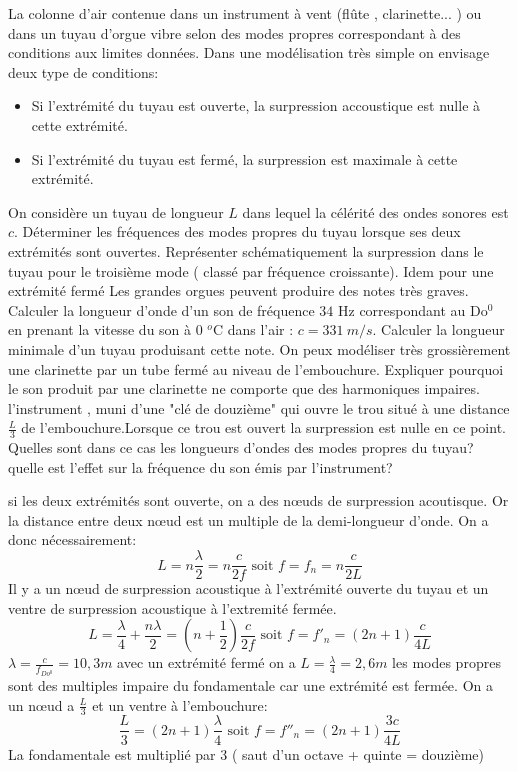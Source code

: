 \begin{Exercise}[title=Fréquence propre d'un tuyau]
	La colonne d'air contenue dans un instrument à vent (flûte , clarinette... ) ou dans un tuyau d'orgue vibre selon des modes propres correspondant à des conditions aux limites données. Dans une modélisation très simple on envisage deux type de  conditions:
	\begin{itemize}
		\item Si l'extrémité du tuyau est ouverte, la surpression accoustique est nulle à cette extrémité.
		\item Si l'extrémité du tuyau est fermé, la surpression est maximale à cette extrémité.
	\end{itemize}
	\Question On considère un tuyau de longueur $L$ dans lequel la  célérité des ondes sonores est $c$.
	\subQuestion Déterminer les fréquences des modes propres du tuyau lorsque ses deux extrémités sont ouvertes. Représenter schématiquement la surpression dans le tuyau pour le troisième mode ( classé par fréquence croissante).
	\subQuestion Idem pour une extrémité fermé
	\Question Les grandes orgues peuvent produire des notes très graves.
    Calculer la longueur d'onde d'un son de fréquence $34$ Hz correspondant au
    Do$^0$ en prenant la vitesse du son à 0 $^o$C dans l'air : $c=331~m/s$. Calculer la longueur minimale d'un tuyau produisant cette note.
	\Question On peux modéliser très grossièrement une clarinette par un tube fermé au niveau de l'embouchure.
	\subQuestion Expliquer pourquoi le son produit par une clarinette ne comporte que des harmoniques impaires.
	\subQuestion l'instrument , muni d'une "clé de douzième" qui ouvre le trou situé à une distance $\frac{L}{3}$ de l'embouchure.Lorsque ce trou est ouvert la surpression est nulle en ce point. Quelles sont dans ce cas les longueurs d'ondes des modes propres du tuyau? quelle est l'effet sur la fréquence du son émis par l'instrument?
\end{Exercise}
\begin{Answer}
	\Question
	\subQuestion si les deux extrémités sont ouverte, on a des nœuds de surpression acoutisque. Or la distance entre deux nœud est un multiple de la demi-longueur d'onde. On a donc nécessairement:
	\[L= n \frac{\lambda}{2} = n\frac{c}{2f} \text{ soit } f=f_n=n\frac{c}{2L}\]
	\subQuestion Il y a un nœud de surpression acoustique à l'extrémité ouverte du tuyau et un ventre de surpression acoustique à l'extremité fermée.
	\[L=\frac{\lambda}{4}+\frac{n\lambda}{2}=\left(n+\frac{1}{2}\right)\frac{c}{2f} \text{ soit }f=f'_n=(2n+1)\frac{c}{4L}\]
	\Question $\lambda=\frac{c}{f_{Do^0}}=10,3 m$ avec un extrémité fermé on a $L=\frac{\lambda}{4}=2,6m$
	\Question
	\subQuestion les modes propres sont des multiples impaire du fondamentale car une extrémité est fermée.
	\subQuestion On a un nœud a $\frac{L}{3}$ et un ventre à l'embouchure:
	\[ \frac{L}{3}=(2n+1)\frac{\lambda}{4} \text{ soit } f=f''_n=(2n+1)\frac{3c}{4L}\]
	La fondamentale est multiplié par 3 ( saut d'un octave + quinte = douzième)
\end{Answer}
